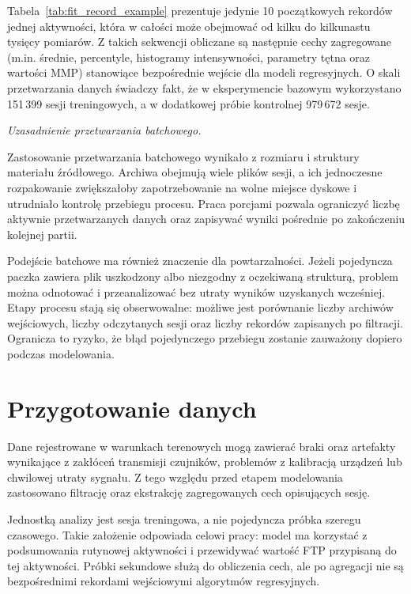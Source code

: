 

Tabela~\ref{tab:fit_record_example} prezentuje jedynie 10 początkowych rekordów jednej aktywności, która w całości może obejmować od kilku do kilkunastu tysięcy pomiarów. Z takich sekwencji obliczane są następnie cechy zagregowane (m.in. średnie, percentyle, histogramy intensywności, parametry tętna oraz wartości MMP) stanowiące bezpośrednie wejście dla modeli regresyjnych. O skali przetwarzania danych świadczy fakt, że w eksperymencie bazowym wykorzystano 151\,399 sesji treningowych, a w dodatkowej próbie kontrolnej 979\,672 sesje.

\FloatBarrier

\par\medskip
\noindent\textit{Uzasadnienie przetwarzania batchowego.}

Zastosowanie przetwarzania batchowego wynikało z rozmiaru i struktury materiału źródłowego. Archiwa obejmują wiele plików sesji, a ich jednoczesne rozpakowanie zwiększałoby zapotrzebowanie na wolne miejsce dyskowe i utrudniało kontrolę przebiegu procesu. Praca porcjami pozwala ograniczyć liczbę aktywnie przetwarzanych danych oraz zapisywać wyniki pośrednie po zakończeniu kolejnej partii.

Podejście batchowe ma również znaczenie dla powtarzalności. Jeżeli pojedyncza paczka zawiera plik uszkodzony albo niezgodny z oczekiwaną strukturą, problem można odnotować i przeanalizować bez utraty wyników uzyskanych wcześniej. Etapy procesu stają się obserwowalne: możliwe jest porównanie liczby archiwów wejściowych, liczby odczytanych sesji oraz liczby rekordów zapisanych po filtracji. Ogranicza to ryzyko, że błąd pojedynczego przebiegu zostanie zauważony dopiero podczas modelowania.

\section{Przygotowanie danych}

Dane rejestrowane w warunkach terenowych mogą zawierać braki oraz artefakty wynikające z zakłóceń transmisji czujników, problemów z kalibracją urządzeń lub chwilowej utraty sygnału. Z tego względu przed etapem modelowania zastosowano filtrację oraz ekstrakcję zagregowanych cech opisujących sesję.

Jednostką analizy jest sesja treningowa, a nie pojedyncza próbka szeregu czasowego. Takie założenie odpowiada celowi pracy: model ma korzystać z podsumowania rutynowej aktywności i przewidywać wartość FTP przypisaną do tej aktywności. Próbki sekundowe służą do obliczenia cech, ale po agregacji nie są bezpośrednimi rekordami wejściowymi algorytmów regresyjnych.

